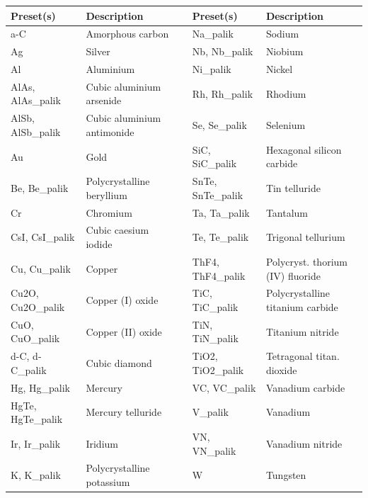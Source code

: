 \begin{table}[hb!]
\centering
\scriptsize
\begin{tabular}{>{\ttfamily}llp{1mm}>{\ttfamily}ll}
\toprule
\rmfamily\textbf{Preset(s)} & \textbf{Description} &&
\rmfamily\textbf{Preset(s)} & \textbf{Description}\\
\cmidrule{1-2} \cmidrule{4-5}
a-C                   & Amorphous carbon &&            Na\_palik             & Sodium \\
Ag                    & Silver &&                      Nb, Nb\_palik         & Niobium \\
Al                    & Aluminium &&                   Ni\_palik             & Nickel \\
AlAs, AlAs\_palik     & Cubic aluminium arsenide &&    Rh, Rh\_palik         & Rhodium \\
AlSb, AlSb\_palik     & Cubic aluminium antimonide &&  Se, Se\_palik         & Selenium \\
Au                    & Gold &&                        SiC, SiC\_palik       & Hexagonal silicon carbide \\
Be, Be\_palik         & Polycrystalline beryllium &&   SnTe, SnTe\_palik     & Tin telluride\\
Cr                    & Chromium &&                    Ta, Ta\_palik         & Tantalum \\
CsI, CsI\_palik       & Cubic caesium iodide &&        Te, Te\_palik         & Trigonal tellurium \\
Cu, Cu\_palik         & Copper &&                      ThF4, ThF4\_palik     & Polycryst. thorium (IV) fluoride \\
Cu2O, Cu2O\_palik     & Copper (I) oxide &&            TiC, TiC\_palik       & Polycrystalline titanium carbide \\
CuO, CuO\_palik       & Copper (II) oxide &&           TiN, TiN\_palik       & Titanium nitride \\
d-C, d-C\_palik       & Cubic diamond &&               TiO2, TiO2\_palik     & Tetragonal titan. dioxide\\
Hg, Hg\_palik         & Mercury &&                     VC, VC\_palik         & Vanadium carbide \\
HgTe, HgTe\_palik     & Mercury telluride &&           V\_palik              & Vanadium \\
Ir, Ir\_palik         & Iridium &&                     VN, VN\_palik         & Vanadium nitride \\
K, K\_palik           & Polycrystalline potassium &&   W                     & Tungsten \\

\end{tabular}
\end{table}
